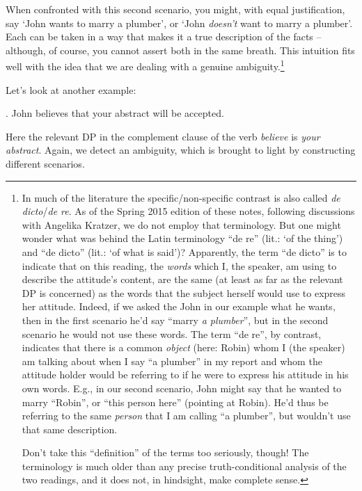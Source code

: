 When confronted with this second scenario, you might, with equal justification, say `John wants to marry a plumber', or `John \emph{doesn't} want to marry a plumber'. Each can be taken in a way that makes it a true description of the facts -- although, of course, you cannot assert both in the same breath. This intuition fits well with the idea that we are dealing with a genuine ambiguity.\footnote{In much of the literature the specific/non-specific contrast is also called \emph{de dicto}/\emph{de re}. As of the Spring 2015 edition of these notes, following discussions with Angelika Kratzer, we do not employ that terminology. But one might wonder what was behind the Latin terminology ``de re'' (lit.: `of the thing') and ``de dicto'' (lit.: `of what is said')? Apparently, the term ``de dicto'' is to indicate that on this reading, the \emph{words} which I, the speaker, am using to describe the attitude's content, are the same (at least as far as the relevant DP is concerned) as the words that the subject herself would use to express her attitude. Indeed, if we asked the John in our example what he wants, then in the first scenario he'd say ``marry \emph{a plumber}'', but in the second scenario he would not use these words. The term ``de re'', by contrast, indicates that there is a common \emph{object} (here: Robin) whom I (the speaker) am talking about when I say ``a plumber'' in my report and whom the attitude holder would be referring to if he were to express his attitude in his own words. E.g., in our second scenario, John might say that he wanted to marry ``Robin'', or ``this person here'' (pointing at Robin). He'd thus be referring to the same \emph{person} that I am calling ``a plumber'', but wouldn't use that same description.

Don't take this ``definition'' of the terms too seriously, though! The terminology is much older than any precise truth-conditional analysis of the two readings, and it does not, in hindsight, make complete sense.}

Let's look at another example:

\ex. John believes that your abstract will be accepted.

Here the relevant DP in the complement clause of the verb \emph{believe} is \emph{your abstract}. Again, we detect an ambiguity, which is brought to light by constructing different scenarios.

